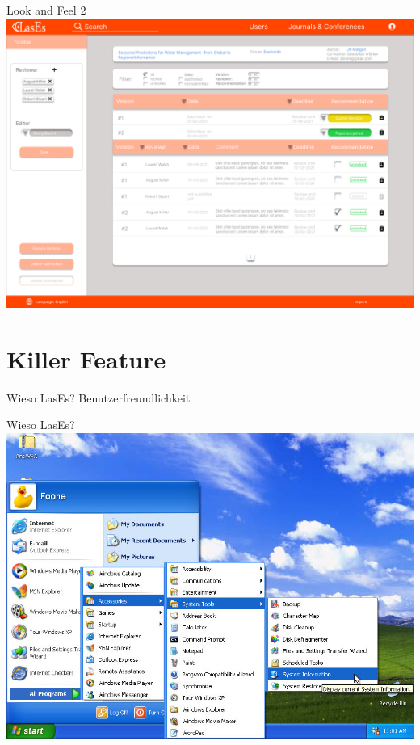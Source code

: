 \documentclass{beamer}
\begin{document}
\begin{frame}{Look and Feel 2}
	\centering
	\includegraphics[height=0.75\textheight]{../../docs/Pflichtenheft/graphics/Submission-png}
\end{frame}

\section{Killer Feature}
\begin{frame}{Wieso LasEs?}
	\centering
	\pause
	\huge Benutzerfreundlichkeit
\end{frame}

\begin{frame}{Wieso LasEs?}
	\centering
	\includegraphics[height=0.8\textheight]{graphics/windowsxp}
\end{frame}
\end{document}
